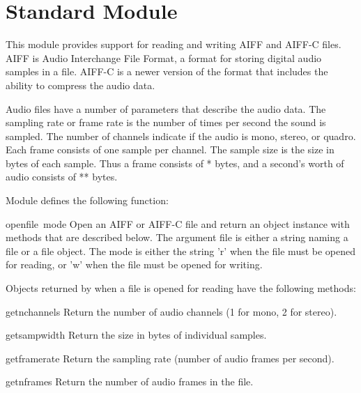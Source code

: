 \section{Standard Module }

This module provides support for reading and writing AIFF and AIFF-C
files.  AIFF is Audio Interchange File Format, a format for storing
digital audio samples in a file.  AIFF-C is a newer version of the
format that includes the ability to compress the audio data.

Audio files have a number of parameters that describe the audio data.
The sampling rate or frame rate is the number of times per second the
sound is sampled.  The number of channels indicate if the audio is
mono, stereo, or quadro.  Each frame consists of one sample per
channel.  The sample size is the size in bytes of each sample.  Thus a
frame consists of * bytes, and a second's worth of
audio consists of ** bytes.

Module  defines the following function:

\renewcommand{\indexsubitem}{(in module aifc)}
\begin{funcdesc}{open}{file\, mode}
Open an AIFF or AIFF-C file and return an object instance with
methods that are described below.  The argument file is either a
string naming a file or a file object.  The mode is either the string
'r' when the file must be opened for reading, or 'w' when the file
must be opened for writing.
\end{funcdesc}

Objects returned by  when a file is opened for
reading have the following methods:

\renewcommand{\indexsubitem}{(aifc object method)}
\begin{funcdesc}{getnchannels}{}
Return the number of audio channels (1 for mono, 2 for stereo).
\end{funcdesc}

\begin{funcdesc}{getsampwidth}{}
Return the size in bytes of individual samples.
\end{funcdesc}

\begin{funcdesc}{getframerate}{}
Return the sampling rate (number of audio frames per second).
\end{funcdesc}

\begin{funcdesc}{getnframes}{}
Return the number of audio frames in the file.
\end{funcdesc}

